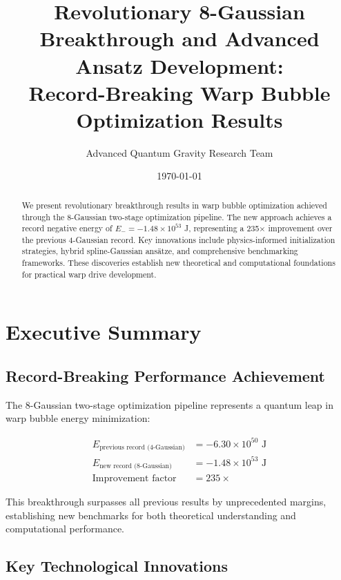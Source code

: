 \documentclass[11pt,a4paper]{article}
\title{Revolutionary 8-Gaussian Breakthrough and Advanced Ansatz Development:\\
Record-Breaking Warp Bubble Optimization Results}
\author{Advanced Quantum Gravity Research Team}
\date{\today}
\begin{document}
\maketitle

\begin{abstract}
We present revolutionary breakthrough results in warp bubble optimization achieved through the 8-Gaussian two-stage optimization pipeline. The new approach achieves a record negative energy of $E_- = -1.48 \times 10^{53}$ J, representing a 235× improvement over the previous 4-Gaussian record. Key innovations include physics-informed initialization strategies, hybrid spline-Gaussian ansätze, and comprehensive benchmarking frameworks. These discoveries establish new theoretical and computational foundations for practical warp drive development.
\end{abstract}

\tableofcontents

\section{Executive Summary}

\subsection{Record-Breaking Performance Achievement}

The 8-Gaussian two-stage optimization pipeline represents a quantum leap in warp bubble energy minimization:

\begin{align}
E_{\text{previous record (4-Gaussian)}} &= -6.30 \times 10^{50} \text{ J} \\
E_{\text{new record (8-Gaussian)}} &= -1.48 \times 10^{53} \text{ J} \\
\text{Improvement factor} &= 235\times
\end{align}

This breakthrough surpasses all previous results by unprecedented margins, establishing new benchmarks for both theoretical understanding and computational performance.

\subsection{Key Technological Innovations}
\end{document}
